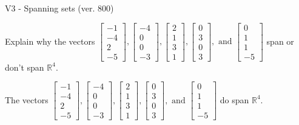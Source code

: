 \begin{exercise}
  \begin{exerciseTitle}V3 - Spanning sets (ver. 800)\end{exerciseTitle}
  \begin{exerciseStatement}
    Explain why the vectors \(\left[\begin{array}{r}
-1 \\
-4 \\
2 \\
-5
\end{array}\right] , \left[\begin{array}{r}
-4 \\
0 \\
0 \\
-3
\end{array}\right] , \left[\begin{array}{r}
2 \\
1 \\
3 \\
1
\end{array}\right] , \left[\begin{array}{r}
0 \\
3 \\
0 \\
3
\end{array}\right] , \text{ and } \left[\begin{array}{r}
0 \\
1 \\
1 \\
-5
\end{array}\right]\) span or don't span \(\mathbb{R}^4\). 
	


  \end{exerciseStatement}
  \begin{exerciseAnswer}
   The vectors \(\left[\begin{array}{r}
-1 \\
-4 \\
2 \\
-5
\end{array}\right] , \left[\begin{array}{r}
-4 \\
0 \\
0 \\
-3
\end{array}\right] , \left[\begin{array}{r}
2 \\
1 \\
3 \\
1
\end{array}\right] , \left[\begin{array}{r}
0 \\
3 \\
0 \\
3
\end{array}\right] , \text{ and } \left[\begin{array}{r}
0 \\
1 \\
1 \\
-5
\end{array}\right]\) 
  	 do  
	span \(\mathbb{R}^4\).
  


  \end{exerciseAnswer}
\end{exercise}